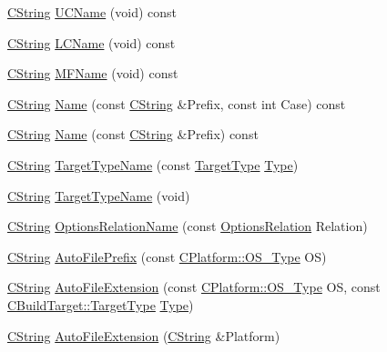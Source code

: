 \begin{DoxyCompactItemize}
\item 
\hyperlink{classCString}{C\-String} \hyperlink{classCBuildTarget_af4c548db9ccae0723b8e2a5d0ee2e854}{U\-C\-Name} (void) const 
\item 
\hyperlink{classCString}{C\-String} \hyperlink{classCBuildTarget_a176a192632b102d9fe7f13e74dec4ab1}{L\-C\-Name} (void) const 
\item 
\hyperlink{classCString}{C\-String} \hyperlink{classCBuildTarget_aa454818e8e930ceeca534be7dfd1d291}{M\-F\-Name} (void) const 
\item 
\hyperlink{classCString}{C\-String} \hyperlink{classCBuildTarget_a9ed0f8434aa864c81b92a2f9e8179592}{Name} (const \hyperlink{classCString}{C\-String} \&Prefix, const int Case) const 
\item 
\hyperlink{classCString}{C\-String} \hyperlink{classCBuildTarget_a0a63f43a245d3847de658c04bab2a779}{Name} (const \hyperlink{classCString}{C\-String} \&Prefix) const 
\item 
\hyperlink{classCString}{C\-String} \hyperlink{classCBuildTarget_a151fe2c898a726d018f55ecd29f865c6}{Target\-Type\-Name} (const \hyperlink{classCBuildTarget_ae920f5ba8e1975bafff70b8b30c449b5}{Target\-Type} \hyperlink{classCBuildTarget_a32caa3497047c676e850c3717b3f415b}{Type})
\item 
\hyperlink{classCString}{C\-String} \hyperlink{classCBuildTarget_aebe5457c8264e962905e36f320742709}{Target\-Type\-Name} (void)
\item 
\hyperlink{classCString}{C\-String} \hyperlink{classCBuildTarget_a88a8ee3495b4e0fa95cc374107284038}{Options\-Relation\-Name} (const \hyperlink{classCBuildTarget_a65a8d160e9cb9cc5632373836e0adb9e}{Options\-Relation} Relation)
\item 
\hyperlink{classCString}{C\-String} \hyperlink{classCBuildTarget_a826b64b7e824094d5d89d278577603ca}{Auto\-File\-Prefix} (const \hyperlink{classCPlatform_a2fb735c63c53052f79629e338bb0f535}{C\-Platform\-::\-O\-S\-\_\-\-Type} O\-S)
\item 
\hyperlink{classCString}{C\-String} \hyperlink{classCBuildTarget_af52379dd5436153f96c154a267f44863}{Auto\-File\-Extension} (const \hyperlink{classCPlatform_a2fb735c63c53052f79629e338bb0f535}{C\-Platform\-::\-O\-S\-\_\-\-Type} O\-S, const \hyperlink{classCBuildTarget_ae920f5ba8e1975bafff70b8b30c449b5}{C\-Build\-Target\-::\-Target\-Type} \hyperlink{classCBuildTarget_a32caa3497047c676e850c3717b3f415b}{Type})
\item 
\hyperlink{classCString}{C\-String} \hyperlink{classCBuildTarget_acd5c16cc0c6d0b9cbba7643ab7ba5f66}{Auto\-File\-Extension} (\hyperlink{classCString}{C\-String} \&Platform)

\end{DoxyCompactItemize}

